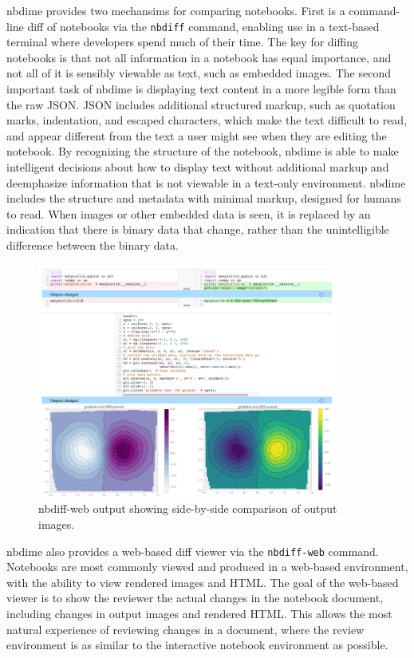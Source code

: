 \documentclass{../../Proposal/Latex-Proposal/deliverablereport}
\begin{document}
nbdime provides two mechansims for comparing notebooks. First is a command-line diff of notebooks
via the \texttt{nbdiff} command, enabling use in a text-based terminal where developers spend much
of their time. The key for diffing notebooks is that not all information in a notebook has equal
importance, and not all of it is sensibly viewable as text, such as embedded images. The second
important task of nbdime is displaying text content in a more legible form than the raw JSON. JSON
includes additional structured markup, such as quotation marks, indentation, and escaped
characters, which make the text difficult to read, and appear different from the text a user might
see when they are editing the notebook. By recognizing the structure of the notebook, nbdime is
able to make intelligent decisions about how to display text without additional markup and deemphasize information that is not viewable in a text-only environment.
nbdime includes the structure and metadata with minimal markup, designed for humans to read.
When images or other embedded data is seen, it is replaced by an indication that there is binary data that change, rather than the unintelligible difference between the binary data.

\begin{figure}
    \center
    \includegraphics[width=10cm]{img/nbdiff-web}
    \caption{nbdiff-web output showing side-by-side comparison of output images.}
    \label{fig:nbdiff-web}
\end{figure}

nbdime also provides a web-based diff viewer via the \texttt{nbdiff-web} command. Notebooks are
most commonly viewed and produced in a web-based environment, with the ability to view rendered
images and HTML. The goal of the web-based viewer is to show the reviewer the actual changes in the
notebook document, including changes in output images and rendered HTML.
This allows the most natural experience of reviewing changes in a document, where the review environment is as similar to the interactive notebook environment as possible.
\end{document}
